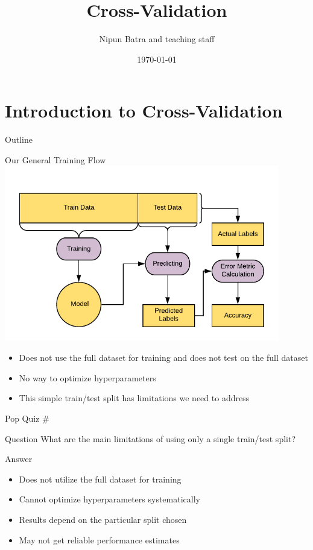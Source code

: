 \documentclass[usenames,dvipsnames]{beamer}
\title{Cross-Validation}
\date{\today}
\author{Nipun Batra and teaching staff}
\institute{IIT Gandhinagar}
\newcounter{popquiz}
\begin{document}
	\maketitle

\section{Introduction to Cross-Validation}

\begin{frame}{Outline}
\tableofcontents
\end{frame}

\begin{frame}{Our General Training Flow}
\includegraphics[width = 0.9\textwidth]{../assets/cross-validation/diagrams/general-workflow}
\begin{itemize}
	\item \pause Does not use the full dataset for training and does not test on the full dataset
	\item \pause No way to optimize hyperparameters
	\item \pause This simple train/test split has limitations we need to address
\end{itemize}
\end{frame}

\begin{frame}{Pop Quiz \#\thepopquiz}
\begin{block}{Question}
What are the main limitations of using only a single train/test split?
\end{block}
\pause
\begin{block}{Answer}
\begin{itemize}
	\item Does not utilize the full dataset for training
	\item Cannot optimize hyperparameters systematically
	\item Results depend on the particular split chosen
	\item May not get reliable performance estimates
\end{itemize}
\end{block}
\end{frame}
\end{document}
